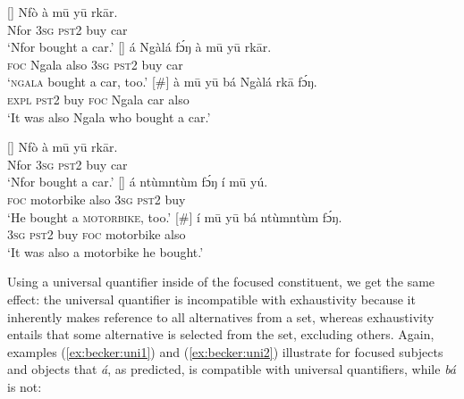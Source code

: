 \documentclass[output=paper,
modfonts
]{langscibook}
\begin{document}
\begin{exe}
\ex
\begin{xlist}
[] {{\label{ex:becker:also1}}
\gll Nf\`o \`a m\=u y\=u rk\=ar. \\
Nfor \textsc{3sg} \textsc{pst2} buy car\\
\glt `Nfor bought a car.'}
[]{ \label{ex:becker:also2}
\gll \'a Ng\`al\'a  f\'ɔŋ \`a m\=u y\=u rk\=ar. \\
\textsc{foc} Ngala also \textsc{3sg} \textsc{pst2} buy car  \\
\glt `\textsc{\MakeLowercase{NGALA}} bought a car, too.'}
[\#] {\label{ex:becker:also3}
\gll \`a m\=u y\=u {b\'a} Ng\`al\'a rk\=a f\'ɔŋ. \\
 \textsc{expl} \textsc{pst2} buy \textsc{foc} Ngala car also\\
\glt `It was also Ngala who bought a car.'}
\end{xlist}
\end{exe}



\begin{exe}
\ex
\begin{xlist}
[] {\label{ex:becker:also4} 
\gll Nf\`o \`a m\=u y\=u rk\=ar. \\
Nfor \textsc{3sg} \textsc{pst2} buy car\\
\glt `Nfor bought a car.'}
[]{ \label{ex:becker:also5}
\gll \'a nt\`umnt\`um  f\'ɔŋ \'i m\=u y\'u. \\
\textsc{foc} motorbike also \textsc{3sg} \textsc{pst2} buy  \\
\glt `He bought a \textsc{\MakeLowercase{MOTORBIKE}}, too.'}
[\#] {\label{ex:becker:also6}
\gll \'i m\=u y\=u {b\'a} nt\`umnt\`um f\'ɔŋ. \\
 \textsc{3sg} \textsc{pst2} buy \textsc{foc} motorbike also\\
\glt `It was also a motorbike he bought.'}
\end{xlist}
\end{exe}
Using a universal quantifier inside of the focused constituent, we get the same effect: the universal quantifier is incompatible with exhaustivity because it inherently makes reference to all alternatives from a set, whereas exhaustivity entails that some alternative is selected from the set, excluding others. Again, examples (\ref{ex:becker:uni1}) and (\ref{ex:becker:uni2})  illustrate for focused subjects and objects that \textit{á}, as predicted, is compatible with universal quantifiers, while \textit{bá} is not:
\end{document}
